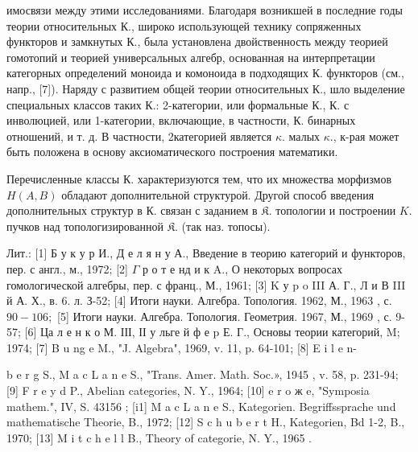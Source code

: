 \documentclass[10pt]{article}
\begin{document}
имосвязи между этими исследованиями. Благодаря возникшей в последние годы теории относительных К., широко использующей технику сопряженных функторов и замкнутых К., была установлена двойственность между теорией гомотопий и теорией универсальных алгебр, основанная на интерпретации категорных определений моноида и комоноида в подходящих К. функторов (см., напр., [7]). Наряду с развитием общей теории относительных К., шло выделение специальных классов таких К.: 2-категории, или формальные К., К. с инволюцией, или 1-категории, включающие, в частности, К. бинарных отношений, и т. д. В частности, 2категорией является $\kappa$. малых $\kappa$., к-рая может быть положена в основу аксиоматического построения математики.



Перечисленные классы К. характеризуются тем, что их множества морфизмов $H(A, B)$ обладают дополнительной структурой. Другой способ введения дополнительных структур в К. связан с заданием в $\mathfrak{K}$. топологии и построении $K$. пучков над топологизированной $\mathfrak{K}$. (так наз. топосы).



Лит.: [1] Б у к у р И., Д е л я н у А., Введение в теорию категорий и функторов, пер. с англ., м., 1972; [2] $\Gamma$ р о т е нд и к A., О некоторых вопросах гомологической алгебры, пер. с франц., М., 1961; [3] K у p o III А. Г., Л и В III й А. Х., в. 6. л. З-52; [4] Итоги науки. Алгебра. Топология. 1962, М., 1963 , с. $90-106 ;$ [5] Итоги науки. Алгебра. Топология. Геометрия. 1967, М., 1969 , с. 9-57; [6] Ца л е н к о М. ІІІ, ІІ у льге й ф е p Е. Г., Основы теории категорий, $\mathrm{M}$; 1974; [7] B u ng e M., "J. Algebra", 1969, v. 11, p. 64-101; [8] E i l e n-

b e r g S., M a c L a n e S., "Trans. Amer. Math. Soc.», 1945 , v. 58, p. 231-94; [9] F r e y d P., Abelian categories, N. Y., 1964; [10] e r o ж e, "Symposia mathem.", IV, S. 43156 ; [i1] M a c L a n e S., Kategorien. Begriffssprache und mathematische Theorie, B., 1972; [12] S c h u b e r t H., Kategorien, Bd 1-2, B., 1970; [13] M i t c h e l l B., Theory of categorie, N. Y., 1965 .
\end{document}
